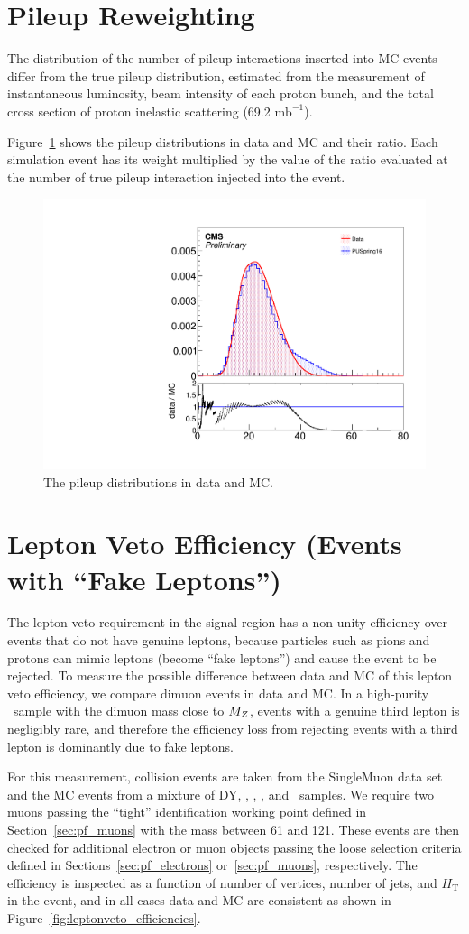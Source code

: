 \section{Pileup Reweighting}
\label{sec:puweight}

The distribution of the number of pileup interactions inserted into MC events differ from the true pileup distribution, estimated from the measurement of instantaneous luminosity, beam intensity of each proton bunch, and the total cross section of proton inelastic scattering (69.2 $\textrm{mb}^{-1}$).

Figure~\ref{fig:pudist} shows the pileup distributions in data and MC and their ratio. 
Each simulation event has its weight multiplied by the value of the ratio evaluated at the number of true pileup interaction injected into the event.

\begin{figure}[htbp]
  \centering
  \includegraphics[width=0.48\linewidth]{Calibration/Figures/PUMoriond17.pdf}
  \caption{
    The pileup distributions in data and MC.
  }
  \label{fig:pudist}
\end{figure}

\section{Lepton Veto Efficiency (Events with ``Fake Leptons'')}
\label{sec:fake_lepton_veto}
The lepton veto requirement in the signal region has a non-unity efficiency over events that do not have genuine leptons, because particles such as pions and protons can mimic leptons (become ``fake leptons'') and cause the event to be rejected. 
To measure the possible difference between data and MC of this lepton veto efficiency, we compare dimuon events in data and MC. 
In a high-purity \Zmm\  sample with the dimuon mass close to $M_{{Z}}$, events with a genuine third lepton is negligibly rare, and therefore the efficiency loss from rejecting events with a third lepton is dominantly due to fake leptons.

For this measurement, collision events are taken from the SingleMuon data set and the MC events from a mixture of DY, \ttbar, \PW\PW, \PW\PZ, and \PZ\PZ\ samples. 
We require two muons passing the ``tight'' identification working point defined in Section~\ref{sec:pf_muons} with the mass between 61 and 121\GeV. 
These events are then checked for additional electron or muon objects passing the loose selection criteria defined in Sections~\ref{sec:pf_electrons} or~\ref{sec:pf_muons}, respectively. 
The efficiency is inspected as a function of number of vertices, number of jets, and $H_{\mathrm{T}}$ in the event, and in all cases data and MC are consistent as shown in Figure~\ref{fig:leptonveto_efficiencies}.

